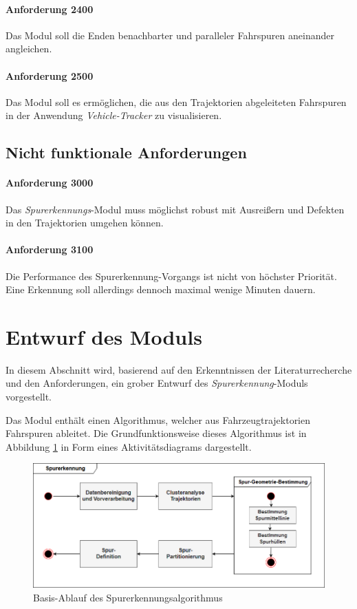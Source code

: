 \paragraph{Anforderung 2400}
Das Modul soll die Enden benachbarter und paralleler Fahrspuren aneinander angleichen.

\paragraph{Anforderung 2500}
Das Modul soll es ermöglichen, die aus den Trajektorien abgeleiteten Fahrspuren in der Anwendung \textit{Vehicle-Tracker}
zu visualisieren.

\subsection{Nicht funktionale Anforderungen}

\paragraph{Anforderung 3000}
Das \textit{Spurerkennungs}-Modul muss möglichst robust mit Ausreißern und Defekten in den Trajektorien umgehen können.

\paragraph{Anforderung 3100}
Die Performance des Spurerkennung-Vorgangs ist nicht von höchster Priorität. Eine Erkennung soll allerdings
dennoch maximal wenige Minuten dauern.

\section{Entwurf des Moduls}
\label{sec:design}

In diesem Abschnitt wird, basierend auf den Erkenntnissen der Literaturrecherche und den Anforderungen,
ein grober Entwurf des \textit{Spurerkennung}-Moduls vorgestellt.

Das Modul enthält einen Algorithmus, welcher aus Fahrzeugtrajektorien Fahrspuren ableitet.
Die Grundfunktionsweise dieses Algorithmus ist in Abbildung \ref{fig:concept_laneDetection_activity}
in Form eines Aktivitätsdiagrams dargestellt.

\begin{figure}[H]
    \centering
    \includegraphics[width=0.9\linewidth]{resources/img/konzeption/activity_laneDetection}
    \caption{Basis-Ablauf des Spurerkennungsalgorithmus}
    \label{fig:concept_laneDetection_activity}
\end{figure}

